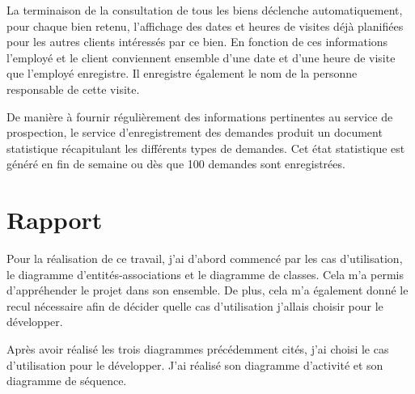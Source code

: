 La terminaison de la consultation de tous les biens déclenche automatiquement, pour chaque bien retenu, l'affichage des dates et heures de visites déjà planifiées pour les autres clients intéressés par ce bien. En fonction de ces informations l'employé et le client conviennent ensemble d'une date et d'une heure de visite que l'employé enregistre. Il enregistre également le nom de la personne responsable de cette visite.

De manière à fournir régulièrement des informations pertinentes au service de prospection, le service d'enregistrement des demandes produit un document statistique récapitulant les différents types de demandes. Cet état statistique est généré en fin de semaine ou dès que 100 demandes sont enregistrées.

\section{Rapport}

Pour la réalisation de ce travail, j'ai d'abord commencé par les cas d'utilisation, le diagramme d'entités-associations et le diagramme de classes. Cela m'a permis d'appréhender le projet dans son ensemble. De plus, cela m'a également donné le recul nécessaire afin de décider quelle cas d'utilisation j'allais choisir pour le développer.

Après avoir réalisé les trois diagrammes précédemment cités, j'ai choisi le cas d'utilisation \selectedusecase{} pour le développer. J'ai réalisé son diagramme d'activité et son diagramme de séquence.
